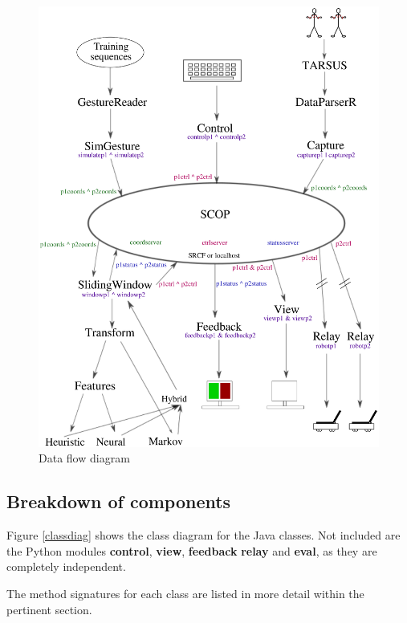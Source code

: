 \documentclass[12pt,a4,notitlepage]{report}
\renewcommand{\_}{\texttt{\symbol{95}}}
\newcommand{\<}{\texttt{\symbol{60}}}
\renewcommand{\>}{\texttt{\symbol{62}}}
\newcommand{\class}[1]{\textbf{#1}}
\begin{document}
\begin{figure}
\centering
\includegraphics[scale=0.75,angle=0]{diagrams/dataflowdiagram.ps}
\caption{Data flow diagram}
\label{dfd}
\end{figure}

\subsection{Breakdown of components}

Figure \ref{classdiag} shows the class diagram for the Java classes. Not included are the Python modules \class{control}, \class{view}, \class{feedback} \class{relay} and \class{eval}, as they are completely independent.

The method signatures for each class are listed in more detail within the pertinent section.
\end{document}
